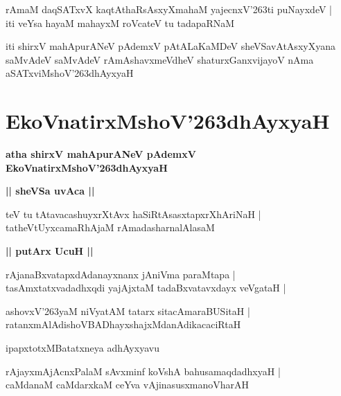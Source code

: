 \documentclass[twoside,12pt,openright]{book}
\def\S{\char'263}
\newcounter{shloka}[chapter]
\def\uvaca#1{\centerline{{\large\textbf{#1}}}}
\begin{document}
\begin{shloka}%
rAmaM daqSATxvX kaqtAthaRsAsxyXmahaM yajecnxV\S ti puNayxdeV |\\
iti veYsa hayaM mahayxM roVcateV tu tadapaRNaM 
\end{shloka}

\begin{center}
iti shirxV mahApurANeV pAdemxV pAtALaKaMDeV sheVSavAtAsxyXyana saMvAdeV 
saMvAdeV rAmAshavxmeVdheV shaturxGanxvijayoV nAma aSATxviMshoV\S dhAyxyaH
\end{center}

\chapter{EkoVnatirxMshoV\S dhAyxyaH}

\begin{center}
{\LARGE\bfseries atha shirxV mahApurANeV pAdemxV  EkoVnatirxMshoV\S dhAyxyaH}
\end{center}

\uvaca{|| sheVSa uvAca ||}

\begin{shloka}%
teV tu tAtavacashuyxrXtAvx haSiRtAsasxtapxrXhAriNaH |\\
tatheVtUyxcamaRhAjaM rAmadasharnalAlasaM 
\end{shloka}

\uvaca{|| putArx UcuH ||}

\begin{shloka}%
rAjanaBxvatapxdAdanayxnanx jAniVma paraMtapa |\\
tasAmxtatxvadadhxqdi yajAjxtaM tadaBxvatavxdayx veVgataH |\\
\end{shloka}

\begin{shloka}%
ashovxV\S yaM niVyatAM tatarx sitacAmaraBUSitaH |\\
ratanxmAlAdishoVBADhayxshajxMdanAdikacaciRtaH
\end{shloka}

\begin{center}
ipapxtotxMBatatxneya adhAyxyavu
\end{center}

\begin{shloka}%
rAjayxmAjAcnxPalaM sAvxminf koVshA bahusamaqdadhxyaH |\\
caMdanaM caMdarxkaM ceYva vAjinasusxmanoVharAH 
\end{shloka}
\end{document}
